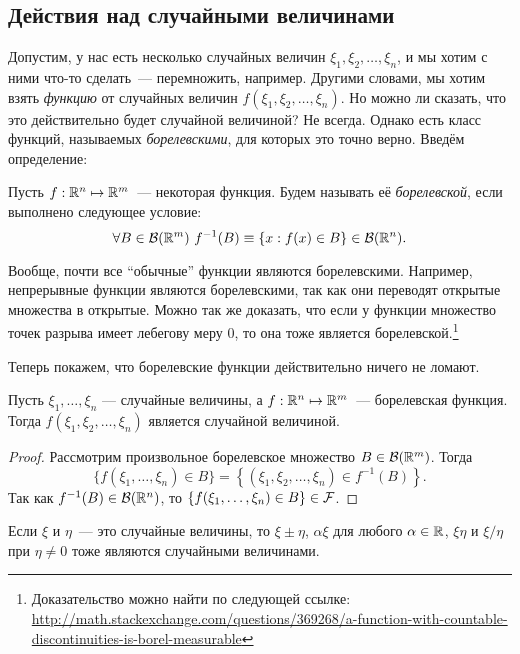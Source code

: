 \subsection{Действия над случайными величинами}
Допустим, у нас есть несколько случайных величин \(\xi_1, \xi_2, \dots, \xi_n\), и мы хотим с ними что-то сделать~--- перемножить, например. Другими словами, мы хотим взять \emph{функцию} от случайных величин \(f(\xi_1, \xi_2, \dots, \xi_n)\). Но можно ли сказать, что это действительно будет случайной величиной? Не всегда. Однако есть класс функций, называемых \emph{борелевскими}, для которых это точно верно. Введём определение:
\begin{definition}
	Пусть \(f : \mathbb{R}^n \mapsto \mathbb{R}^m\)~--- некоторая функция. Будем называть её \emph{борелевской}, если выполнено следующее условие:
	\[
	\forall B \in \mathcal{B}(\mathbb{R}^m)\ f^{-1}(B) \equiv \{x : f(x) \in B\} \in \mathcal{B}(\mathbb{R}^n).
	\]
\end{definition}

Вообще, почти все ``обычные'' функции являются борелевскими. Например, непрерывные функции являются борелевскими, так как они переводят открытые множества в открытые. Можно так же доказать, что если у функции множество точек разрыва имеет лебегову меру 0, то она тоже является борелевской.\footnote{Доказательство можно найти по следующей ссылке: \url{http://math.stackexchange.com/questions/369268/a-function-with-countable-discontinuities-is-borel-measurable}}

Теперь покажем, что борелевские функции действительно ничего не ломают.
\begin{theorem}
	Пусть \(\xi_1, \ldots, \xi_n\) --- случайные величины, а \(f : \mathbb{R}^n \mapsto \mathbb{R}^m\)~--- борелевская функция. Тогда \(f(\xi_1, \xi_2, \dots, \xi_n)\) является случайной величиной.
\end{theorem}
\begin{proof}
	Рассмотрим произвольное борелевское множество \(B \in \mathcal{B}(\mathbb{R}^m)\). Тогда
	\[
	\{f(\xi_1, \dots, \xi_n) \in B\} = \left\{(\xi_1, \xi_2, \dots, \xi_n) \in f^{-1}(B)\right\}.
	\]
	Так как \(f^{-1}(B) \in \mathcal{B}(\mathbb{R}^{n})\), то \(\{f(\xi_1, \dots, \xi_n) \in B\} \in \mathcal{F}\).
\end{proof}
\begin{consequence}
	Если \(\xi\) и \(\eta\)~--- это случайные величины, то \(\xi \pm \eta\), \(\alpha\xi\) для любого \(\alpha \in \mathbb{R}\), \(\xi\eta\) и \(\xi/\eta\) при \(\eta \neq 0\) тоже являются случайными величинами.
\end{consequence}

